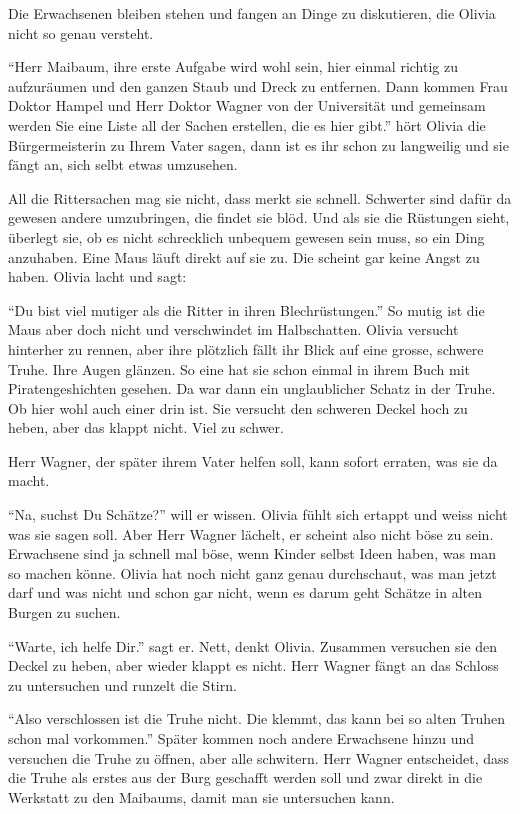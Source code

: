 Die Erwachsenen bleiben stehen und fangen an Dinge zu diskutieren, die Olivia nicht so genau versteht. 

\enquote{Herr Maibaum, ihre erste Aufgabe wird wohl sein, hier einmal richtig zu aufzuräumen und den ganzen Staub und Dreck zu entfernen. Dann kommen Frau Doktor Hampel und Herr Doktor Wagner von der Universität und gemeinsam werden Sie eine Liste all der Sachen erstellen, die es hier gibt.} hört Olivia die Bürgermeisterin zu Ihrem Vater sagen, dann ist es ihr schon zu langweilig und sie fängt an, sich selbt etwas umzusehen.

All die Rittersachen mag sie nicht, dass merkt sie schnell. Schwerter sind dafür da gewesen andere umzubringen, die findet sie blöd. Und als sie die Rüstungen sieht, überlegt sie, ob es nicht schrecklich unbequem gewesen sein muss, so ein Ding anzuhaben. Eine Maus läuft direkt auf sie zu. Die scheint gar keine Angst zu haben. Olivia lacht und sagt:

\enquote{Du bist viel mutiger als die Ritter in ihren Blechrüstungen.} So mutig ist die Maus aber doch nicht und verschwindet im Halbschatten. Olivia versucht hinterher zu rennen, aber ihre plötzlich fällt ihr Blick auf eine grosse, schwere Truhe. Ihre Augen glänzen. So eine hat sie schon einmal in ihrem Buch mit Piratengeshichten gesehen. Da war dann ein unglaublicher Schatz in der Truhe. Ob hier wohl auch einer drin ist. Sie versucht den schweren Deckel hoch zu heben, aber das klappt nicht. Viel zu schwer. 

Herr Wagner, der später ihrem Vater helfen soll, kann sofort erraten, was sie da macht. 

\enquote{Na, suchst Du Schätze?} will er wissen. Olivia fühlt sich ertappt und weiss nicht was sie sagen soll. Aber Herr Wagner lächelt, er scheint also nicht böse zu sein. Erwachsene sind ja schnell mal böse, wenn Kinder selbst Ideen haben, was man so machen könne. Olivia hat noch nicht ganz genau durchschaut, was man jetzt darf und was nicht und schon gar nicht, wenn es darum geht Schätze in alten Burgen zu suchen.

\enquote{Warte, ich helfe Dir.} sagt er. Nett, denkt Olivia. Zusammen versuchen sie den Deckel zu heben, aber wieder klappt es nicht. Herr Wagner fängt an das Schloss zu untersuchen und runzelt die Stirn.

\enquote{Also verschlossen ist die Truhe nicht. Die klemmt, das kann bei so alten Truhen schon mal vorkommen.} Später kommen noch andere Erwachsene hinzu und versuchen die Truhe zu öffnen, aber alle schwitern. Herr Wagner entscheidet, dass die Truhe als erstes aus der Burg geschafft werden soll und zwar direkt in die Werkstatt zu den Maibaums, damit man sie untersuchen kann.

